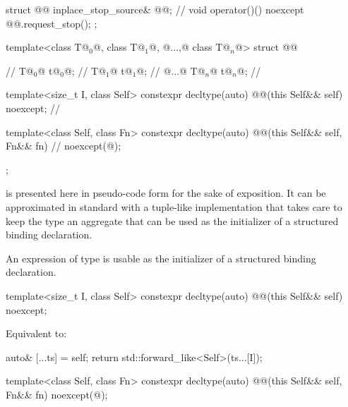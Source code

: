 \pnum
\begin{codeblock}
struct @@ {
  inplace_stop_source& @@;       // \expos
  void operator()() noexcept { @@.request_stop(); }
};
\end{codeblock}

\pnum
\begin{codeblock}
template<class T@$_0$@, class T@$_1$@, @...,@ class T@$_n$@>
struct @@ {       // \expos
  T@$_0$@ t@$_0$@;                // \expos
  T@$_1$@ t@$_1$@;                // \expos
    @...@
  T@$_n$@ t@$_n$@;                // \expos

  template<size_t I, class Self>
  constexpr decltype(auto) @@(this Self&& self) noexcept;      // \expos

  template<class Self, class Fn>
  constexpr decltype(auto) @@(this Self&& self, Fn&& fn)     // \expos
    noexcept(@\seebelow@);
};
\end{codeblock}

\pnum
\begin{note}
 is presented here in pseudo-code form
for the sake of exposition.
It can be approximated in standard \Cpp{} with a tuple-like implementation
that takes care to keep the type an aggregate
that can be used as the initializer of a structured binding declaration.
\end{note}
\begin{note}
An expression of type  is usable as
the initializer of a structured binding declaration.
\end{note}

\begin{itemdecl}
template<size_t I, class Self>
constexpr decltype(auto) @@(this Self&& self) noexcept;
\end{itemdecl}

\begin{itemdescr}
\pnum
\effects
Equivalent to:
\begin{codeblock}
auto& [...ts] = self;
return std::forward_like<Self>(ts...[I]);
\end{codeblock}
\end{itemdescr}

\begin{codeblock}
template<class Self, class Fn>
constexpr decltype(auto) @@(this Self&& self, Fn&& fn) noexcept(@\seebelow@);
\end{codeblock}

